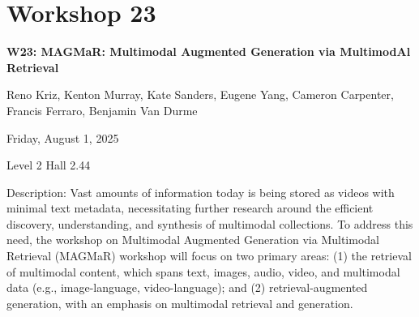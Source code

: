 \clearpage


\section[W23: MAGMaR: Multimodal Augmented Generation via MultimodAl Retrieval ]{Workshop 23}
\label{workshop_23}

\begin{center}
    {\Large \textbf{W23: MAGMaR: Multimodal Augmented Generation via MultimodAl Retrieval }}\\

     \vspace{5mm}


Reno Kriz, Kenton Murray, Kate Sanders, Eugene Yang, Cameron Carpenter, Francis Ferraro, Benjamin Van Durme\\

 \vspace{5mm}
 
    Friday, August 1, 2025

  Level 2 Hall 2.44
    
\end{center}

Description: Vast amounts of information today is being stored as videos with minimal text metadata, necessitating further research around the efficient discovery, understanding, and synthesis of multimodal collections. To address this need, the workshop on Multimodal Augmented Generation via Multimodal Retrieval (MAGMaR) workshop will focus on two primary areas: (1) the retrieval of multimodal content, which spans text, images, audio, video, and multimodal data (e.g., image-language, video-language); and (2) retrieval-augmented generation, with an emphasis on multimodal retrieval and generation.


